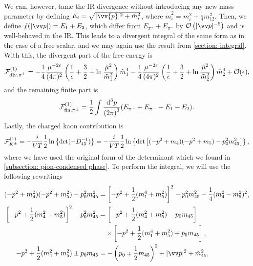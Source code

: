 We can, however, tame the IR divergence without introducing any new mass parameter by defining $E_i = \sqrt{|\vv{p}|^2 + \tilde m_i^2}$, where $\tilde m_i^2 = m_i^2 + \frac{1}{4} m_{12}^2$.
Then, we define $f(|\vv p|) = E_1 + E_2$, which differ from $E_{\pi^+} + E_{\pi^-}$ by $\Oh\left(|\vv p|^{-5}\right)$ and is well-behaved in the IR.
This leads to a divergent integral of the same form as in the case of a free scalar, and we may again use the result from \autoref{section: integral}.
With this, the divergent part of the free energy is
%
\begin{equation}
    \mathcal{F}^{(1)}_{\mathrm{div}, {\pi^\pm} }
    =
    - \frac{1}{4} \frac{\mu^{-2 \epsilon}}{(4\pi)^2} 
    \left(
        \frac{1}{\epsilon} + \frac{3}{2} + \ln \frac{\tilde \mu^2}{\tilde m_1^2}
    \right) \tilde m_1^4
    - \frac{1}{4} \frac{\mu^{-2 \epsilon}}{(4\pi)^2} 
    \left(
        \frac{1}{\epsilon} + \frac{3}{2} + \ln \frac{\tilde \mu^2}{\tilde m_2^2}
    \right) \tilde m_2^4
    + \mathcal{O}(\epsilon),
\end{equation}
%
and the remaining finite part is
%
\begin{equation}
    \mathcal{F}^{(1)}_{\mathrm{fin}, {\pi^\pm}}
    = 
    \frac{1}{2} \int \frac{\text{d}^3 p}{{(2\pi)}^3} (E_{\pi^+} + E_{\pi^-} - E_1 - E_2).
\end{equation}
%
Lastly, the charged kaon contribution is
%
\begin{equation}
    \mathcal{F}^{(1)}_{{K^\pm}}
    =
    -\frac{i}{VT}\frac{1}{2}
    \ln\left\{ 
        \det(-D_{45}^{-1})
    \right\}
    =
    -\frac{i}{VT}\frac{1}{2}
    \ln\left\{ 
        \det\left[(- p^2 + m_4)(- p^2 + m_5) - p_0^2m_{45}^2\right]
    \right\},
\end{equation}
%
where we have used the original form of the determinant which we found in \autoref{subsection: pion-condensed phase}.
To perform the integral, we will use the following rewritings
%
\begin{align*}
    (-p^2 + m_4^2)(-p^2 + m_5^2) - p_0^2 m_{45}^2
    &
    = \left[-p^2 + \frac{1}{2}(m_1^4 + m_5^2)\right]^2 
    - p_0^2 m_{45}^2 - \frac{1}{4}(m_4^2 - m_5^2)^2, \\
    \left[-p^2 + \frac{1}{2}(m_4^2 + m_5^2)\right]^2 - p_0^2 m_{45}^2
    &
    = \left[-p^2 + \frac{1}{2}(m_4^2 + m_5^2) - p_0 m_{45} \right]\\
    &\quad\times
    \left[-p^2 + \frac{1}{2}(m_1^4 + m_5^2) + p_0 m_{45} \right], \\
    - p^2 + \frac{1}{2}(m_4^2 + m_5^2) \pm p_0 m_{45}
    &= - \left(p_0 \mp \frac{1}{2}m_{45}\right)^2 + |\vv p|^2 
    + 
    \tilde m_{45}^2, 
\end{align*}
